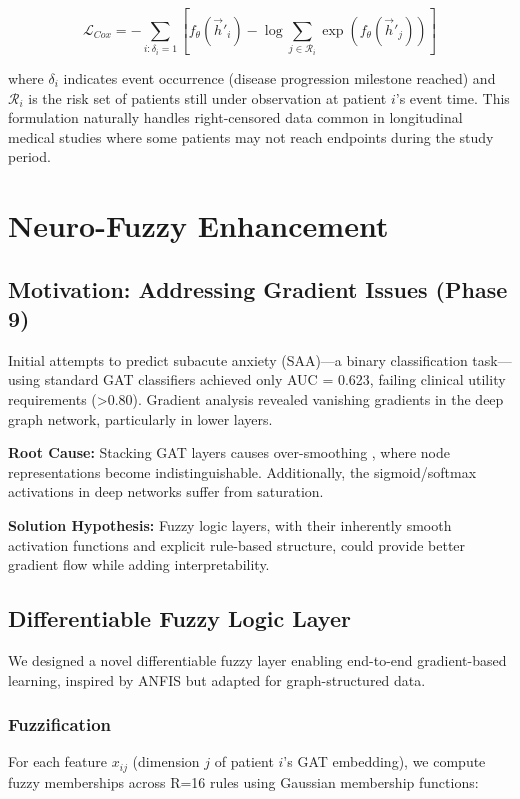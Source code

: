 \documentclass[journal,twoside,web]{ieeecolor}
\begin{document}
\begin{equation}
\mathcal{L}_{Cox} = -\sum_{i: \delta_i=1} \left[f_\theta(\vec{h}'_i) - \log\sum_{j \in \mathcal{R}_i} \exp(f_\theta(\vec{h}'_j))\right]
\end{equation}

where $\delta_i$ indicates event occurrence (disease progression milestone reached) and $\mathcal{R}_i$ is the risk set of patients still under observation at patient $i$'s event time. This formulation naturally handles right-censored data common in longitudinal medical studies where some patients may not reach endpoints during the study period.


\section{Neuro-Fuzzy Enhancement}
\label{sec:neurofuzzy}

\subsection{Motivation: Addressing Gradient Issues (Phase 9)}

Initial attempts to predict subacute anxiety (SAA)---a binary classification task---using standard GAT classifiers achieved only AUC = 0.623, failing clinical utility requirements (>0.80). Gradient analysis revealed vanishing gradients in the deep graph network, particularly in lower layers.

\textbf{Root Cause:} Stacking GAT layers causes over-smoothing \cite{li2018deeper}, where node representations become indistinguishable. Additionally, the sigmoid/softmax activations in deep networks suffer from saturation.

\textbf{Solution Hypothesis:} Fuzzy logic layers, with their inherently smooth activation functions and explicit rule-based structure, could provide better gradient flow while adding interpretability.

\subsection{Differentiable Fuzzy Logic Layer}

We designed a novel differentiable fuzzy layer enabling end-to-end gradient-based learning, inspired by ANFIS \cite{jang1993anfis} but adapted for graph-structured data.

\subsubsection{Fuzzification}
For each feature $x_{ij}$ (dimension $j$ of patient $i$'s GAT embedding), we compute fuzzy memberships across R=16 rules using Gaussian membership functions:
\end{document}
